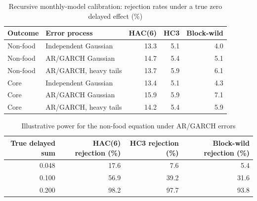 \begin{table}[htbp]
\centering\small
\caption{Recursive monthly-model calibration: rejection rates under a true zero delayed effect (\%)}
\begin{tabularx}{\linewidth}{lXrrr}
\toprule
Outcome &Error process&HAC(6)&HC3&Block-wild\\
\midrule
Non-food & Independent Gaussian & 13.3 & 5.1 & 4.0\\
Non-food & AR/GARCH Gaussian & 14.7 & 5.4 & 5.1\\
Non-food & AR/GARCH, heavy tails & 13.7 & 5.9 & 6.1\\
Core & Independent Gaussian & 13.4 & 5.1 & 4.3\\
Core & AR/GARCH Gaussian & 15.9 & 5.9 & 7.1\\
Core & AR/GARCH, heavy tails & 14.2 & 5.4 & 5.9\\
\bottomrule
\end{tabularx}
\end{table}

\begin{table}[htbp]
\centering\small
\caption{Illustrative power for the non-food equation under AR/GARCH errors}
\begin{tabular}{rrrr}
\toprule
True delayed sum&HAC(6) rejection (\%)&HC3 rejection (\%)&Block-wild rejection (\%)\\
\midrule
0.048 & 17.6 & 7.6 & 5.4\\
0.100 & 56.9 & 39.2 & 31.6\\
0.200 & 98.2 & 97.7 & 93.8\\
\bottomrule
\end{tabular}
\end{table}
